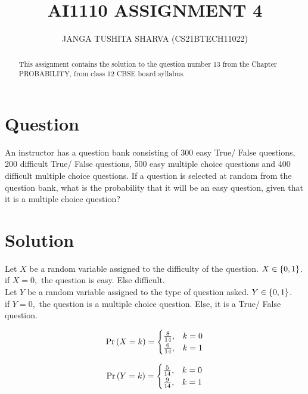 \documentclass[journal,12pt,twocolumn]{IEEEtran}
\begin{document}
    
\title{
	AI1110 ASSIGNMENT 4
}
\author{ JANGA TUSHITA SHARVA (CS21BTECH11022)%
}	

\maketitle


\maketitle

\begin{abstract}
This assignment contains the solution to the question number 13 from the Chapter PROBABILITY, from class 12 CBSE board syllabus.
\end{abstract}


\section{Question}

An instructor has a question bank consisting of 300 easy True/ False questions, 200 difficult True/ False questions, 500 easy multiple choice questions and 400 difficult multiple choice questions. If a question is selected at random from the question bank, what is the probability that it will be an easy question, given that it is a multiple choice question?

\section{Solution}
Let $X$ be a random variable assigned to the difficulty of the question.
$X \in \left\{0, 1\right\}$. \\
if $X = 0,$ the question is easy. Else difficult.\\
Let $Y$ be a random variable assigned to the type of question asked.
$Y \in \left\{0, 1\right\}$. \\
if $Y = 0,$ the question is a multiple choice question. Else, it is a True/ False question.

\begin{equation}
    \Pr\left(X = k\right) = 
      \begin{cases}
      \frac{8}{14}, & k = 0 \\
      \frac{6}{14}, & k = 1 
      \end{cases}
\end{equation}

\begin{equation}
    \Pr\left(Y = k\right) = 
      \begin{cases}
      \frac{5}{14}, & k = 0 \\
      \frac{9}{14}, & k = 1 
      \end{cases}
\end{equation}
\end{document}
